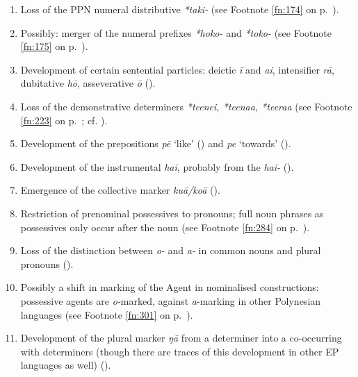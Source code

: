 \begin{enumerate}
\item 
Loss of the PPN numeral distributive  \textit{*taki-} (see Footnote \ref{fn:174} on p.~\pageref{fn:174}).

\item 
Possibly: merger of the numeral prefixes \textit{*hoko-} and \textit{*toko-} (see Footnote \ref{fn:175} on p.~\pageref{fn:175}).

\item 
Development of certain sentential particles: deictic \textit{{\ꞌ}ī} and \textit{{\ꞌ}ai}, intensifier \textit{rā}, dubitative \textit{hō}, asseverative \textit{{\ꞌ}ō} ().

\item 
Loss of the demonstrative determiners \textit{*teenei, *teenaa, *teeraa} (see Footnote \ref{fn:223} on p.~\pageref{fn:223}; cf. \citealt[44]{Pawley1966}).

\item 
Development of the prepositions \textit{pē} ‘like’ () and \textit{pe} ‘towards’ ().

\item 
Development of the instrumental  \textit{hai}, probably from the  \textit{hai-} ().

\item 
Emergence of the collective marker \textit{kuā}\textit{/koā} ().

\item 
Restriction of prenominal possessives to pronouns; full noun phrases as possessives only occur after the noun (see Footnote \ref{fn:284} on p.~\pageref{fn:284}).

\item 
Loss of the distinction between \textit{o-} and \textit{a-} in common nouns and plural pronouns ().

\item 
Possibly a shift in marking of the Agent in nominalised constructions: possessive agents are \textit{o-}marked, against \textit{a}{}-marking in other Polynesian languages (see Footnote \ref{fn:301} on p.~\pageref{fn:301}).

\item 
Development of the plural marker \textit{ŋā} from a determiner into a  co-occur\-ring with determiners (though there are traces of this development in other EP languages as well) ().


\end{enumerate}
